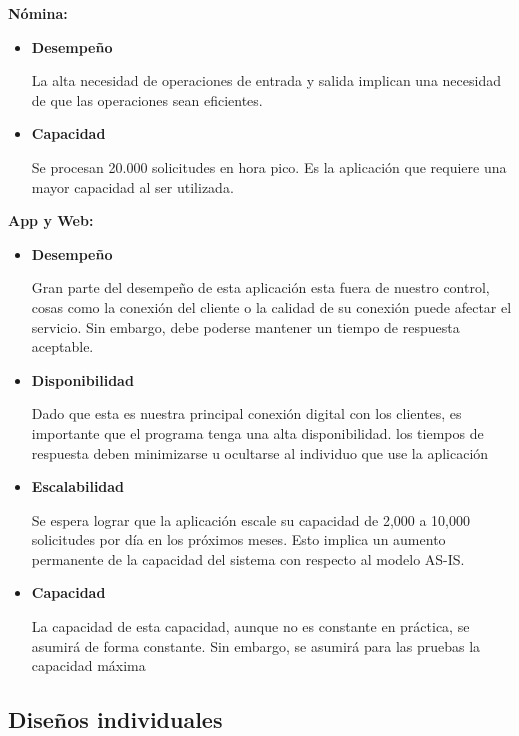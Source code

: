 \documentclass[a4paper]{article}
\begin{document}
\textbf{Nómina:}
\begin{itemize}
    \item \textbf{Desempeño}
    
    La alta necesidad de operaciones de entrada y salida implican una necesidad de que las operaciones sean eficientes.  

    \item \textbf{Capacidad}
    
    Se procesan 20.000 solicitudes en hora pico. Es la aplicación que requiere una mayor capacidad 
    al ser utilizada.

\end{itemize}

\textbf{App y Web:}
\begin{itemize}
    \item \textbf{Desempeño}
    
    Gran parte del desempeño de esta aplicación esta fuera de nuestro control, cosas como la conexión del
    cliente o la calidad de su conexión puede afectar el servicio. Sin embargo, debe poderse mantener un tiempo
    de respuesta aceptable.

    \item \textbf{Disponibilidad}
    
    Dado que esta es nuestra principal conexión digital con los clientes, es importante que el programa
    tenga una alta disponibilidad. los tiempos de respuesta deben minimizarse u ocultarse al individuo que 
    use la aplicación

    \item \textbf{Escalabilidad} 
    
    Se espera lograr que la aplicación escale su capacidad de 
    2,000 a 10,000 solicitudes por día en los próximos meses. Esto
    implica un aumento permanente de la capacidad del sistema con respecto al
    modelo AS-IS.
    
    \item \textbf{Capacidad}
    
    La capacidad de esta capacidad, aunque no es constante en práctica, se asumirá de forma
    constante. Sin embargo, se asumirá para las pruebas la capacidad máxima

\end{itemize}

\subsection{Diseños individuales}
\end{document}
